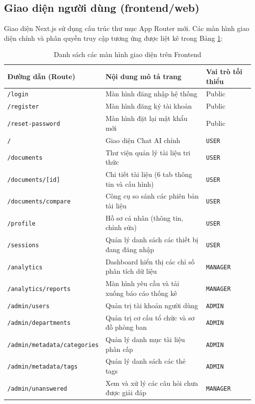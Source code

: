 \documentclass[12pt,a4paper]{report}
\begin{document}
\subsection{Giao diện người dùng (frontend/web)}
Giao diện Next.js sử dụng cấu trúc thư mục App Router mới. Các màn hình giao diện chính và phân quyền truy cập tương ứng được liệt kê trong Bảng \ref{tab:routes_list}:

\begin{table}[H]
\centering
\caption{Danh sách các màn hình giao diện trên Frontend}
\label{tab:routes_list}
\begin{tabularx}{\textwidth}{|l|X|l|}
\hline
\rowcolor{gray!10}
Đường dẫn (Route) & Nội dung mô tả trang & Vai trò tối thiểu \\ \hline
\texttt{/login} & Màn hình đăng nhập hệ thống & Public \\ \hline
\texttt{/register} & Màn hình đăng ký tài khoản & Public \\ \hline
\texttt{/reset-password} & Màn hình đặt lại mật khẩu mới & Public \\ \hline
\texttt{/} & Giao diện Chat AI chính & \texttt{USER} \\ \hline
\texttt{/documents} & Thư viện quản lý tài liệu tri thức & \texttt{USER} \\ \hline
\texttt{/documents/[id]} & Chi tiết tài liệu (6 tab thông tin và cấu hình) & \texttt{USER} \\ \hline
\texttt{/documents/compare} & Công cụ so sánh các phiên bản tài liệu & \texttt{USER} \\ \hline
\texttt{/profile} & Hồ sơ cá nhân (thông tin, chỉnh sửa) & \texttt{USER} \\ \hline
\texttt{/sessions} & Quản lý danh sách các thiết bị đang đăng nhập & \texttt{USER} \\ \hline
\texttt{/analytics} & Dashboard hiển thị các chỉ số phân tích dữ liệu & \texttt{MANAGER} \\ \hline
\texttt{/analytics/reports} & Màn hình yêu cầu và tải xuống báo cáo thống kê & \texttt{MANAGER} \\ \hline
\texttt{/admin/users} & Quản trị tài khoản người dùng & \texttt{ADMIN} \\ \hline
\texttt{/admin/departments} & Quản trị cơ cấu tổ chức và sơ đồ phòng ban & \texttt{ADMIN} \\ \hline
\texttt{/admin/metadata/categories} & Quản lý danh mục tài liệu phân cấp & \texttt{ADMIN} \\ \hline
\texttt{/admin/metadata/tags} & Quản lý danh sách các thẻ tags & \texttt{ADMIN} \\ \hline
\texttt{/admin/unanswered} & Xem và xử lý các câu hỏi chưa được giải đáp & \texttt{MANAGER} \\ \hline
\end{tabularx}
\end{table}
\end{document}
